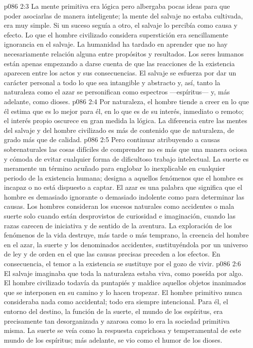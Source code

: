 \vs p086 2:3 \pc La mente primitiva era lógica pero albergaba pocas ideas para que poder asociarlas de manera inteligente; la mente del salvaje no estaba cultivada, era muy simple. Si un suceso seguía a otro, el salvaje lo percibía como causa y efecto. Lo que el hombre civilizado considera superstición era sencillamente ignorancia en el salvaje. La humanidad ha tardado en aprender que no hay necesariamente relación alguna entre propósitos y resultados. Los seres humanos están apenas empezando a darse cuenta de que las reacciones de la existencia aparecen entre los actos y sus consecuencias. El salvaje se esfuerza por dar un carácter personal a todo lo que sea intangible y abstracto y, así, tanto la naturaleza como el azar se personifican como espectros ---espíritus--- y, más adelante, como dioses.
\vs p086 2:4 \pc Por naturaleza, el hombre tiende a creer en lo que él estima que es lo mejor para él, en lo que es de su interés, inmediato o remoto; el interés propio oscurece en gran medida la lógica. La diferencia entre las mentes del salvaje y del hombre civilizado es más de contenido que de naturaleza, de grado más que de calidad.
\vs p086 2:5 Pero continuar atribuyendo a causas sobrenaturales las cosas difíciles de comprender no es más que una manera ociosa y cómoda de evitar cualquier forma de dificultoso trabajo intelectual. La suerte es meramente un término acuñado para englobar lo inexplicable en cualquier periodo de la existencia humana; designa a aquellos fenómenos que el hombre es incapaz o no está dispuesto a captar. El azar es una palabra que significa que el hombre es demasiado ignorante o demasiado indolente como para determinar las causas. Los hombres consideran los sucesos naturales como accidentes o mala suerte solo cuando están desprovistos de curiosidad e imaginación, cuando las razas carecen de iniciativa y de sentido de la aventura. La exploración de los fenómenos de la vida destruye, más tarde o más temprano, la creencia del hombre en el azar, la suerte y los denominados accidentes, sustituyéndola por un universo de ley y de orden en el que las causas precisas preceden a los efectos. En consecuencia, el temor a la existencia se sustituye por el gozo de vivir.
\vs p086 2:6 El salvaje imaginaba que toda la naturaleza estaba viva, como poseída por algo. El hombre civilizado todavía da puntapiés y maldice aquellos objetos inanimados que se interponen en su camino y lo hacen tropezar. El hombre primitivo nunca consideraba nada como accidental; todo era siempre intencional. Para él, el entorno del destino, la función de la suerte, el mundo de los espíritus, era precisamente tan desorganizada y azarosa como lo era la sociedad primitiva misma. La suerte se veía como la respuesta caprichosa y temperamental de este mundo de los espíritus; más adelante, se vio como el humor de los dioses.
